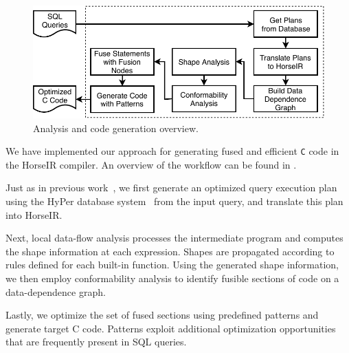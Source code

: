 \begin{figure}[htbp]
\centering
\includegraphics[width=\columnwidth]{./src/figure/overview-v4.pdf}
\caption{Analysis and code generation overview.} \label{fig:overview}
\end{figure}

We have implemented our approach for generating fused and efficient
\texttt{C} code in the HorseIR compiler. An overview of the workflow
can be found in .

Just as in previous work~\OldPaper, we first generate an optimized
query execution plan using the HyPer database system~\cite{Neumann2011:HyPer}
from the input query, and translate this plan into HorseIR. 

Next, local data-flow analysis processes the intermediate program and
computes the shape information at each expression. Shapes are propagated
according to rules defined for each built-in function. Using the
generated shape information, we then employ conformability analysis to
identify fusible sections of code on a data-dependence graph.

Lastly, we optimize the set of fused sections using predefined patterns
and generate target C code. Patterns exploit additional optimization
opportunities that are frequently present in SQL queries.
